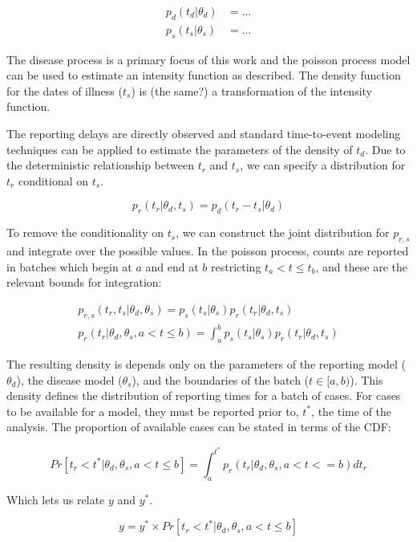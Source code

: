 \begin{align}
p_d(t_d|\theta_d) &= \ldots \\
p_s(t_s|\theta_s) &= \ldots
\end{align}

The disease process is a primary focus of this work and the poisson
process model can be used to estimate an intensity function as
described.  The density function for the dates of illness ($t_s$) is
(the same?) a transformation of the intensity function.

The reporting delays are directly observed and standard time-to-event
modeling techniques can be applied to estimate the parameters of the
density of $t_d$.  Due to the deterministic relationship between $t_r$
and $t_s$, we can specify a distribution for $t_r$ conditional on $t_s$.

\begin{equation}
p_r(t_r|\theta_d, t_s) = p_d(t_r - t_s| \theta_d) 
\end{equation}

To remove the conditionality on $t_s$, we can construct the joint
distribution for $p_{r,s}$ and integrate over the
possible values.  In the poisson process, counts are reported in batches
which begin at $a$ and end at $b$ restricting $t_a < t \le  t_b$,
and these are the relevant bounds for integration:

\begin{align}
p_{r,s}(t_r, t_s| \theta_d, \theta_s) = p_s(t_s|\theta_s) p_r(t_r|\theta_d, t_s) \\
p_r(t_r|\theta_d, \theta_s, a<t\le b) = \int_a^b p_s(t_s|\theta_s) p_r(t_r|\theta_d, t_s)
\end{align}

The resulting density is depends only on the parameters of the reporting
model ($\theta_d$), the disease model ($\theta_s$), and the boundaries
of the batch ($t \in [a,b)$).  This density defines the distribution of
reporting times for a batch of cases.  For cases to be available for a
model, they must be reported prior to, $t^*$,  the time of the analysis.  
The proportion of available cases can be stated in terms of the CDF: 

\begin{equation}
Pr[t_r < t^*| \theta_d, \theta_s, a<t\le b] = \int_a^{t^*} p_r(t_r|\theta_d, \theta_s, a<t<=b) dt_r
\end{equation}

Which lets us relate $y$ and $y^*$.

\begin{equation}
y = y^* \times Pr[t_r < t^*| \theta_d, \theta_s, a<t\le b]
\end{equation}

